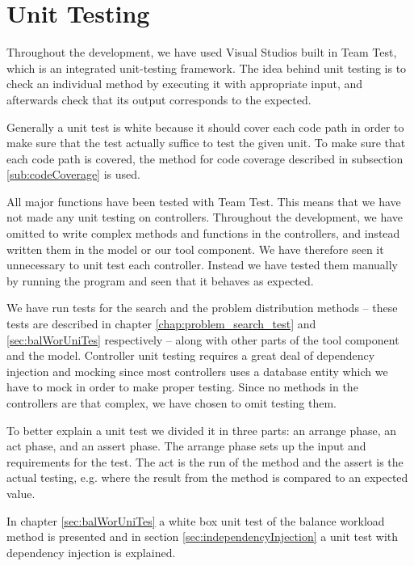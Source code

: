 \section{Unit Testing}
\label{chap:testing}
Throughout the development, we have used Visual Studios built in Team Test, which is an integrated unit-testing framework. \cite{teamtest}
The idea behind unit testing is to check an individual method by executing it with appropriate input, and afterwards check that its output corresponds to the expected.

Generally a unit test is white because it should cover each code path in order to make sure that the test actually suffice to test the given unit. \cite[p.~39]{williams06}
To make sure that each code path is covered, the method for code coverage described in subsection \ref{sub:codeCoverage} is used.

All major functions have been tested with Team Test. This means that we have not made any unit testing on controllers. 
Throughout the development, we have omitted to write complex methods and functions in the controllers, and instead written them in the model or our tool component. We have therefore seen it unnecessary to unit test each controller. Instead we have tested them manually by running the program and seen that it behaves as expected. 

We have run tests for the search and the problem distribution methods -- these tests are described in chapter \ref{chap:problem_search_test} and \ref{sec:balWorUniTes} respectively -- along with other parts of the tool component and the model.
Controller unit testing requires a great deal of dependency injection and mocking since most controllers uses a database entity which we have to mock in order to make proper testing.
Since no methods in the controllers are that complex, we have chosen to omit testing them.

To better explain a unit test we divided it in three parts: an arrange phase, an act phase, and an assert phase. 
The arrange phase sets up the input and requirements for the test. 
The act is the run of the method and the assert is the actual testing, e.g. where the result from the method is compared to an expected value. 

In chapter \ref{sec:balWorUniTes} a white box unit test of the balance workload method is presented and in section \ref{sec:independencyInjection} a unit test with dependency injection is explained.